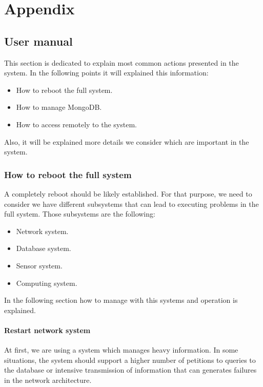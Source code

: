 
\chapter{Appendix}
\newpage

\section{User manual}
This section is dedicated to explain most common actions presented in the system. In the following points it will explained this information:

\begin{itemize}
\item How to reboot the full system.
\item How to manage MongoDB.
\item How to access remotely to the system.
\end{itemize}

Also, it will be explained more details we consider which are important in the system.\\

\subsection{How to reboot the full system}

A completely reboot should be likely established. For that purpose, we need to consider we have different subsystems that can lead to executing problems in the full system. Those subsystems are the following:

\begin{itemize}
\item Network system.
\item Database system.
\item Sensor system.
\item Computing system.
\end{itemize}

In the following section how to manage with this systems and operation is explained.\\

\subsubsection{Restart network system}

At first, we are using a system which manages heavy information. In some situations, the system should support a higher number of petitions to queries to the database or intensive transmission of information that can generates failures in the network architecture.\\

